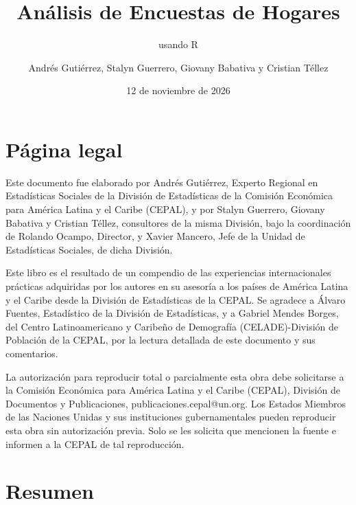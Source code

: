 \documentclass[
  spanish,
  11pt,
  letterpaper,
  oneside,
  open=any]{scrbook}
\title{Análisis de Encuestas de Hogares}
\subtitle{usando R}
\author{Andrés Gutiérrez, Stalyn Guerrero, Giovany Babativa y Cristian
Téllez}
\date{12 de noviembre de 2026}
\renewcommand*\contentsname{Tabla de contenidos}
\newcommand\contentsname{Tabla de contenidos}
\begin{document}
\frontmatter
\maketitle

\renewcommand*\contentsname{Tabla de contenidos}
{
\setcounter{tocdepth}{2}
\tableofcontents
}
\listoffigures
\listoftables

\mainmatter
{}

\chapter*{Página legal}\label{legal}


Este documento fue elaborado por Andrés Gutiérrez, Experto Regional en
Estadísticas Sociales de la División de Estadísticas de la Comisión
Económica para América Latina y el Caribe (CEPAL), y por Stalyn
Guerrero, Giovany Babativa y Cristian Téllez, consultores de la misma
División, bajo la coordinación de Rolando Ocampo, Director, y Xavier
Mancero, Jefe de la Unidad de Estadísticas Sociales, de dicha División.

Este libro es el resultado de un compendio de las experiencias
internacionales prácticas adquiridas por los autores en su asesoría a
los países de América Latina y el Caribe desde la División de
Estadísticas de la CEPAL. Se agradece a Álvaro Fuentes, Estadístico de
la División de Estadísticas, y a Gabriel Mendes Borges, del Centro
Latinoamericano y Caribeño de Demografía (CELADE)-División de Población
de la CEPAL, por la lectura detallada de este documento y sus
comentarios.

La autorización para reproducir total o parcialmente esta obra debe
solicitarse a la Comisión Económica para América Latina y el Caribe
(CEPAL), División de Documentos y Publicaciones,
publicaciones.cepal@un.org. Los Estados Miembros de las Naciones Unidas
y sus instituciones gubernamentales pueden reproducir esta obra sin
autorización previa. Solo se les solicita que mencionen la fuente e
informen a la CEPAL de tal reproducción.


\chapter*{Resumen}\label{resumen}
\end{document}
